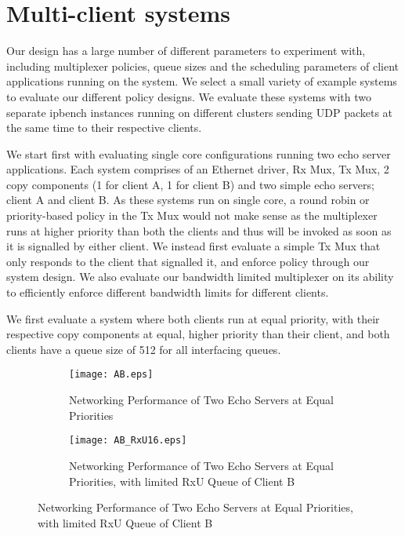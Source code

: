 \section{Multi-client systems}

Our design has a large number of different parameters to experiment with, including multiplexer
policies, queue sizes and the scheduling parameters of client applications running on the system. 
We select a small variety of example systems to evaluate our different policy designs. We evaluate
these systems with two separate ipbench instances running on different clusters sending UDP packets
at the same time to their respective clients.

We start first with evaluating single core configurations running two echo server applications. 
Each system comprises of an Ethernet driver, Rx Mux, Tx Mux, 2 copy components (1 for client A, 1 for client B) 
and two simple echo servers; client A and client B. As these systems run on single core, a round robin or priority-based
policy in the Tx Mux would not make sense as the multiplexer runs at higher priority than both the clients and thus
will be invoked as soon as it is signalled by either client. We instead first evaluate a simple Tx Mux that only 
responds to the client that signalled it, and enforce policy through our system design. We also evaluate our
bandwidth limited multiplexer on its ability to efficiently enforce different bandwidth limits for different clients.

We first evaluate a system where both clients run at equal priority, with their respective copy components at 
equal, higher priority than their client, and both clients have a queue size of 512 for all interfacing queues.

\noindent\begin{figure}[H]
    \centering
	\begin{multicols}{2}
		\begin{subfigure}[b]{0.45\textwidth}
        \centering
        \texttt{[image: AB.eps]}
        \caption{Networking Performance of Two Echo Servers at Equal Priorities}
        \label{f:AB}
    \end{subfigure}\qquad
    \begin{subfigure}[b]{0.45\textwidth}
        \centering
        \texttt{[image: AB\_RxU16.eps]}
        \caption{Networking Performance of Two Echo Servers at Equal Priorities, with limited RxU Queue of Client B}
        \label{f:AB_Rx16}
    \end{subfigure}
\end{multicols}
\end{figure}

